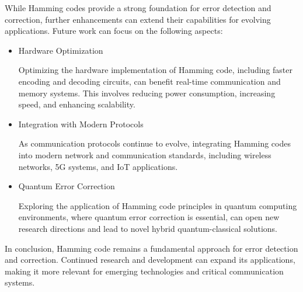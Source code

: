 \documentclass{article}
\begin{document}
While Hamming codes provide a strong foundation for error detection and correction, further enhancements can extend their capabilities for evolving applications. Future work can focus on the following aspects:
\begin{itemize}

\item {Hardware Optimization}

Optimizing the hardware implementation of Hamming code, including faster encoding and decoding circuits, can benefit real-time communication and memory systems. This involves reducing power consumption, increasing speed, and enhancing scalability.

\item {Integration with Modern Protocols}

As communication protocols continue to evolve, integrating Hamming codes into modern network and communication standards, including wireless networks, 5G systems, and IoT applications.

\item {Quantum Error Correction}

Exploring the application of Hamming code principles in quantum computing environments, where quantum error correction is essential, can open new research directions and lead to novel hybrid quantum-classical solutions.
\end{itemize}
In conclusion, Hamming code remains a fundamental approach for error detection and correction. Continued research and development can expand its applications, making it more relevant for emerging technologies and critical communication systems.
    
%


\end{document}
